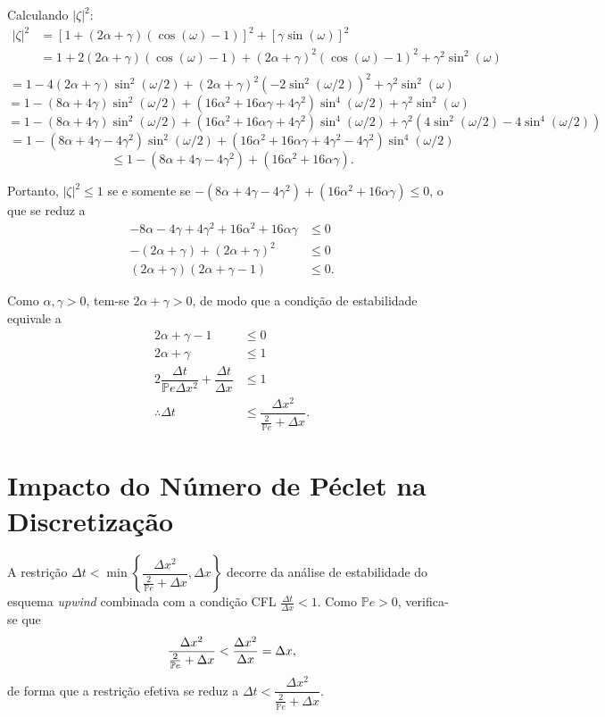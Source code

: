 \documentclass[12pt, a4paper]{article}
\newcommand{\bb}[1]{\mathbb{#1}}
\newcommand{\D}[1]{\Delta#1}
\newcommand{\Pe}{\bb{P}e}
\begin{document}
    Calculando $|\zeta|^2$:
    \[\begin{split}
        |\zeta|^2 &= {[1+(2\alpha+\gamma)(\cos(\omega)-1)]}^2 + {[\gamma\sin(\omega)]}^2\\
        &= 1 + 2(2\alpha+\gamma)(\cos(\omega)-1) + {(2\alpha+\gamma)}^2{(\cos(\omega)-1)}^2 + \gamma^2\sin^2(\omega)\\
    \end{split}\]
    \[= 1 - 4(2\alpha+\gamma)\sin^2(\omega/2) + {(2\alpha+\gamma)}^2{(-2\sin^2(\omega/2))}^2 + \gamma^2\sin^2(\omega)\]
    \[= 1 - (8\alpha+4\gamma)\sin^2(\omega/2) + (16\alpha^2+16\alpha\gamma+4\gamma^2)\sin^4(\omega/2) + \gamma^2\sin^2(\omega)\]
    \[= 1 - (8\alpha+4\gamma)\sin^2(\omega/2) + (16\alpha^2+16\alpha\gamma+4\gamma^2)\sin^4(\omega/2) + \gamma^2(4\sin^2(\omega/2)-4\sin^4(\omega/2))\]
    \[= 1 - (8\alpha+4\gamma-4\gamma^2)\sin^2(\omega/2) + (16\alpha^2+16\alpha\gamma+4\gamma^2-4\gamma^2)\sin^4(\omega/2)\]
    \[\leq 1 - (8\alpha+4\gamma-4\gamma^2) + (16\alpha^2+16\alpha\gamma).\]

    Portanto, $|\zeta|^2 \leq 1$ se e somente se $-(8\alpha+4\gamma-4\gamma^2) + (16\alpha^2+16\alpha\gamma) \leq 0$, o que se reduz a
    \[\begin{split}
        -8\alpha-4\gamma+4\gamma^2 + 16\alpha^2+16\alpha\gamma &\leq 0\\
        -(2\alpha+\gamma)+{(2\alpha+\gamma)}^2 &\leq 0\\
        (2\alpha+\gamma)(2\alpha+\gamma-1) &\leq 0.
    \end{split}\]

    Como $\alpha,\gamma > 0$, tem-se $2\alpha+\gamma > 0$, de modo que a condição de estabilidade equivale a
    \[\begin{split}
        2\alpha+\gamma -1 &\leq 0\\
        2\alpha+\gamma &\leq 1\\
        2\dfrac{\D{t}}{\bb{P}e\D{x^2}} + \dfrac{\D{t}}{\D{x}} &\leq 1\\
        \therefore \D{t} &\leq \dfrac{\D{x^2}}{\frac{2}{\bb{P}e}+\D{x}}.
    \end{split}\]

    \section{Impacto do Número de Péclet na Discretização}\label{sec:peclet}

    A restrição $\Delta t < \min\left\{ \dfrac{\Delta x^2}{\frac{2}{\bb{P}e} + \Delta x}, \Delta x \right\}$ decorre da análise de estabilidade do esquema \textit{upwind} combinada com a condição CFL $\frac{\D{t}}{\D{x}} < 1$. Como $\Pe > 0$, verifica-se que
    \begin{align}
        \frac{\Delta x^2}{\frac{2}{\bb{P}e}+ \D{x}} < \frac{\Delta x^2}{\D{x}} = \D{x}, \notag
    \end{align}
    de forma que a restrição efetiva se reduz a $\Delta t < \dfrac{\Delta x^2}{\frac{2}{\bb{P}e} + \Delta x}$.
\end{document}
